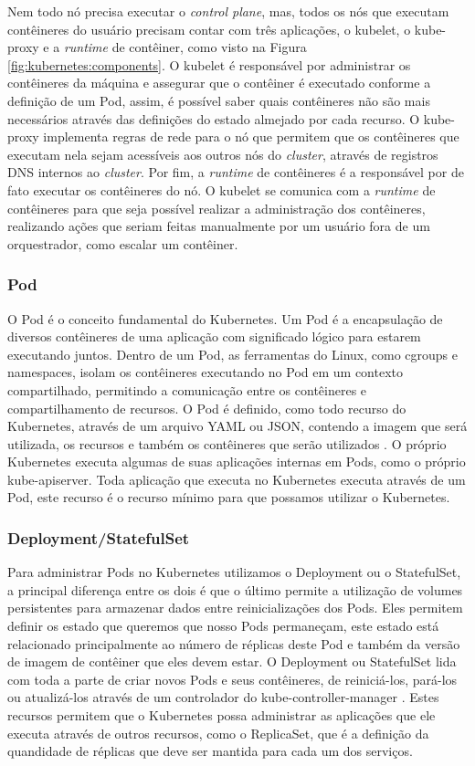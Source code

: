 Nem todo nó precisa executar o \textit{control plane}, mas, todos os nós que
executam contêineres do usuário precisam contar com três aplicações, o kubelet,
o kube-proxy e a \textit{runtime} de contêiner, como visto na Figura
\ref{fig:kubernetes:components}. O kubelet é responsável por administrar os
contêineres da máquina e assegurar que o contêiner é executado conforme a
definição de um Pod, assim, é possível saber quais contêineres não são mais
necessários através das definições do estado almejado por cada recurso. O
kube-proxy implementa regras de rede para o nó que permitem que os contêineres
que executam nela sejam acessíveis aos outros nós do \textit{cluster}, através
de registros DNS internos ao \textit{cluster}. Por fim, a \textit{runtime} de
contêineres é a responsável por de fato executar os contêineres do nó. O kubelet
se comunica com a \textit{runtime} de contêineres para que seja possível realizar
a administração dos contêineres, realizando ações que seriam feitas manualmente
por um usuário fora de um orquestrador, como escalar um contêiner.

\subsubsection{Pod}

O Pod é o conceito fundamental do Kubernetes. Um Pod é a encapsulação de
diversos contêineres de uma aplicação com significado lógico para estarem
executando juntos. Dentro de um Pod, as ferramentas do Linux, como cgroups e
namespaces, isolam os contêineres executando no Pod em um contexto
compartilhado, permitindo a comunicação entre os contêineres e compartilhamento
de recursos. O Pod é definido, como todo recurso do Kubernetes, através de um
arquivo YAML ou JSON, contendo a imagem que será utilizada, os recursos e
também os contêineres que serão utilizados \cite{kubernetes:pod}. O próprio
Kubernetes executa algumas de suas aplicações internas em Pods, como o próprio
kube-apiserver. Toda aplicação que executa no Kubernetes executa através de um
Pod, este recurso é o recurso mínimo para que possamos utilizar o Kubernetes.

\subsubsection{Deployment/StatefulSet}

Para administrar Pods no Kubernetes utilizamos o Deployment ou o StatefulSet,
a principal diferença entre os dois é que o último permite a utilização de
volumes persistentes para armazenar dados entre reinicializações dos Pods.
Eles permitem definir os estado que queremos que nosso Pods permaneçam, este
estado está relacionado principalmente ao número de réplicas deste Pod e
também da versão de imagem de contêiner que eles devem estar. O Deployment
ou StatefulSet lida com toda a parte de criar novos Pods e seus contêineres,
de reiniciá-los, pará-los ou atualizá-los através de um controlador do
kube-controller-manager \cite{kubernetes:deployment}. Estes recursos permitem
que o Kubernetes possa administrar as aplicações que ele executa através de
outros recursos, como o ReplicaSet, que é a definição da quandidade de réplicas
que deve ser mantida para cada um dos serviços.

